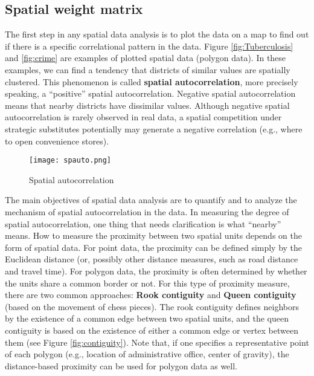 \documentclass[11pt, A4paper, openany, uplatex]{book}
\begin{document}
\subsection{Spatial weight matrix}

The first step in any spatial data analysis is to plot the data on a map to find out if there is a specific correlational pattern in the data.
Figure \ref{fig:Tuberculosis} and \ref{fig:crime} are examples of plotted spatial data (polygon data).
In these examples, we can find a tendency that districts of similar values are spatially clustered.
This phenomenon is called \textbf{spatial autocorrelation}, more precisely speaking, a ``positive'' spatial autocorrelation.
Negative spatial autocorrelation means that nearby districts have dissimilar values.
Although negative spatial autocorrelation is rarely observed in real data, a spatial competition under strategic substitutes potentially may generate a negative correlation (e.g., where to open convenience stores).
\begin{figure}[h!]
	\begin{center}
		\texttt{[image: spauto.png]}
		\caption{Spatial autocorrelation}
	\end{center}
\end{figure}

The main objectives of spatial data analysis are to quantify and to analyze the mechanism of spatial autocorrelation in the data. 
In measuring the degree of spatial autocorrelation, one thing that needs clarification is what ``nearby'' means.
How to measure the proximity between two spatial units depends on the form of spatial data.
For point data, the proximity can be defined simply by the Euclidean distance (or, possibly other distance measures, such as road distance and travel time).
For polygon data, the proximity is often determined by whether the units share a common border or not.
For this type of proximity measure, there are two common approaches: \textbf{Rook contiguity} and \textbf{Queen contiguity} (based on the movement of chess pieces).
The rook contiguity defines neighbors by the existence of a common edge between two spatial units, and the queen contiguity is based on the existence of either a common edge or vertex between them (see Figure \ref{fig:contiguity}).
Note that, if one specifies a representative point of each polygon (e.g., location of administrative office, center of gravity), the distance-based proximity can be used for polygon data as well.
\end{document}
